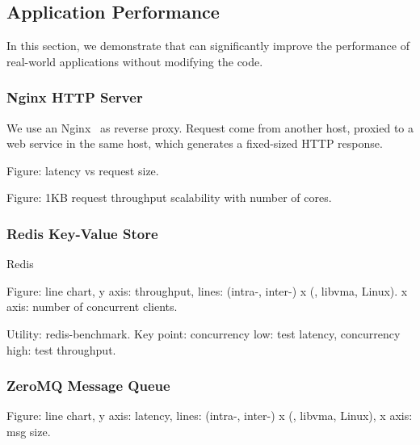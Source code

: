 \subsection{Application Performance}
\label{subsec:application}

In this section, we demonstrate that \sys{} can significantly improve the performance of real-world applications without modifying the code.

\subsubsection{Nginx HTTP Server}
\quad

We use an Nginx~\cite{nginx} as reverse proxy. Request come from another host, proxied to a web service in the same host, which generates a fixed-sized HTTP response.

Figure: latency vs request size.

Figure: 1KB request throughput scalability with number of cores.

\subsubsection{Redis Key-Value Store}
\quad

Redis~\cite{redis}

Figure: line chart, y axis: throughput, lines: (intra-, inter-) x (\sys{}, libvma, Linux). x axis: number of concurrent clients.

Utility: redis-benchmark.
Key point: concurrency low: test latency, concurrency high: test throughput.





\subsubsection{ZeroMQ Message Queue}
\quad

Figure: line chart, y axis: latency, lines: (intra-, inter-) x (\sys{}, libvma, Linux), x axis: msg size.


